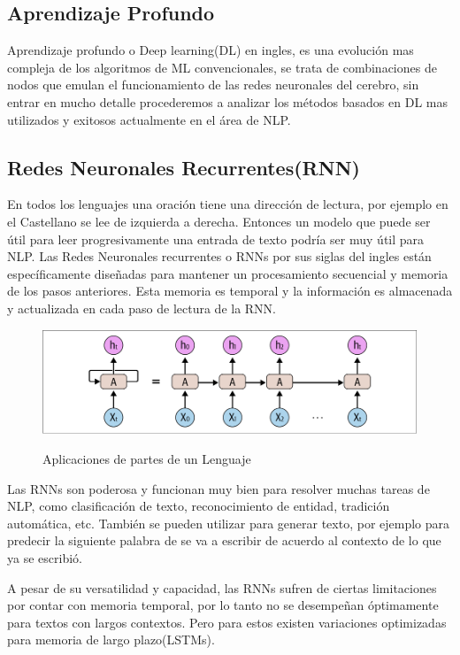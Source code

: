 \subsection{Aprendizaje Profundo}

Aprendizaje profundo o Deep learning(DL) en ingles, es una evolución mas compleja de los algoritmos
de ML convencionales,
se trata de combinaciones de nodos que emulan el funcionamiento de las redes neuronales del
cerebro, sin entrar en mucho detalle procederemos a analizar los métodos basados en DL mas
utilizados y exitosos actualmente en el área de NLP.

\subsection{Redes Neuronales Recurrentes(RNN)}

En todos los lenguajes una oración tiene una dirección de lectura, por ejemplo en el Castellano se
lee de izquierda a derecha. Entonces un modelo que puede ser útil para leer progresivamente una
entrada de texto podría ser muy útil para NLP. Las Redes Neuronales recurrentes o RNNs por sus
siglas del ingles están específicamente diseñadas para mantener
un procesamiento secuencial y memoria de los pasos anteriores. Esta memoria es temporal y la
información es almacenada y
actualizada en cada paso de lectura de la RNN.

\begin{figure}[h]
	\centering
	\includegraphics[width=\textwidth]{imagenes/Cap 2/rnn.png}
	\caption{Aplicaciones de partes de un Lenguaje}
	\label{fig:RNN}
	\cite{sowmya_practical_npl}
\end{figure}

Las RNNs son poderosa y funcionan muy bien para resolver muchas tareas de NLP, como clasificación
de texto, reconocimiento
de entidad, tradición automática, etc. También se pueden utilizar para generar texto, por ejemplo
para predecir la
siguiente palabra de se va a escribir de acuerdo al contexto de lo que ya se escribió.

A pesar de su versatilidad y capacidad, las RNNs sufren de ciertas limitaciones por contar con
memoria temporal, por lo
tanto no se desempeñan óptimamente para textos con largos contextos. Pero para estos existen
variaciones optimizadas para
memoria de largo plazo(LSTMs).

